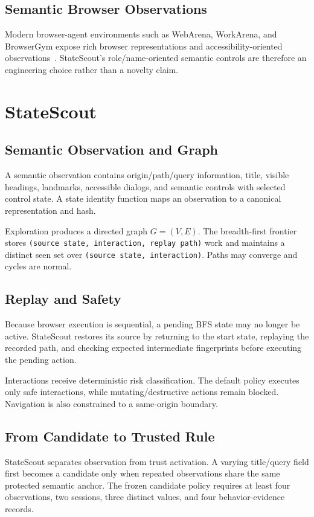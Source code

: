 \documentclass[conference]{IEEEtran}
\begin{document}
\subsection{Semantic Browser Observations}
Modern browser-agent environments such as WebArena, WorkArena, and BrowserGym expose rich browser representations and accessibility-oriented observations~\cite{zhou2024webarena,drouin2024workarena,chezelles2024browsergym}. StateScout's role/name-oriented semantic controls are therefore an engineering choice rather than a novelty claim.

\section{StateScout}
\subsection{Semantic Observation and Graph}
A semantic observation contains origin/path/query information, title, visible headings, landmarks, accessible dialogs, and semantic controls with selected control state. A state identity function maps an observation to a canonical representation and hash.

Exploration produces a directed graph $G=(V,E)$. The breadth-first frontier stores \texttt{(source state, interaction, replay path)} work and maintains a distinct seen set over \texttt{(source state, interaction)}. Paths may converge and cycles are normal.

\subsection{Replay and Safety}
Because browser execution is sequential, a pending BFS state may no longer be active. StateScout restores its source by returning to the start state, replaying the recorded path, and checking expected intermediate fingerprints before executing the pending action.

Interactions receive deterministic risk classification. The default policy executes only safe interactions, while mutating/destructive actions remain blocked. Navigation is also constrained to a same-origin boundary.

\subsection{From Candidate to Trusted Rule}
StateScout separates observation from trust activation. A varying title/query field first becomes a candidate only when repeated observations share the same protected semantic anchor. The frozen candidate policy requires at least four observations, two sessions, three distinct values, and four behavior-evidence records.
\end{document}
